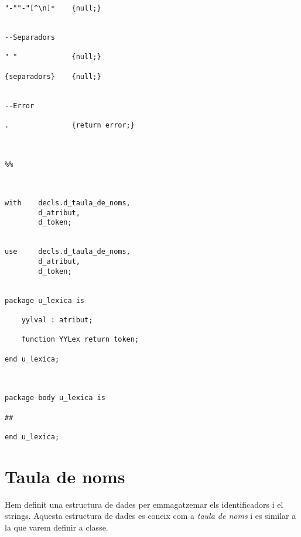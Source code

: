 \documentclass[10pt]{report}
\begin{document}
\begin{lstlisting}
"-""-"[^\n]*    {null;}


--Separadors

" "             {null;}

{separadors}    {null;}


--Error

.               {return error;}



%%



with    decls.d_taula_de_noms,
        d_atribut,
        d_token;
        

use     decls.d_taula_de_noms,
        d_atribut,
        d_token;


package u_lexica is

    yylval : atribut;

    function YYLex return token;
    
end u_lexica;



package body u_lexica is

##

end u_lexica;

    \end{lstlisting}
    
    \newpage
    \section{Taula de noms}
        Hem definit una estructura de dades per emmagatzemar els identificadors i el strings. Aquesta estructura de dades es coneix com a \textit{taula de noms} i es similar a la que varem definir a classe.
        
    
\end{document}
